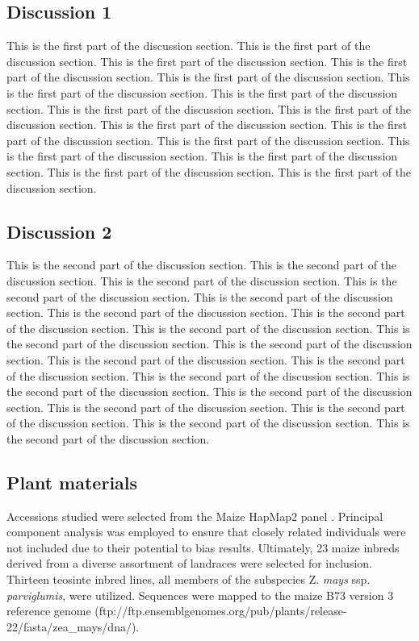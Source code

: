 \documentclass{pnastwo}
\begin{document}
\begin{article}
\subsection{Discussion 1}
This is the first part of the discussion section. This is the first
part of the discussion section. This is the first part of the
discussion section. This is the first part of the discussion
section. This is the first part of the discussion section. This is the
first part of the discussion section. This is the first part of the
discussion section. This is the first part of the discussion
section. This is the first part of the discussion section. This is the
first part of the discussion section. This is the first part of the
discussion section. This is the first part of the discussion
section. This is the first part of the discussion section. This is the
first part of the discussion section. This is the first part of the
discussion section. This is the first part of the discussion section. 

\subsection{Discussion 2}
This is the second part of the discussion section. This is the second
part of the discussion section. This is the second part of the
discussion section. This is the second part of the discussion
section. This is the second part of the discussion section. This is
the second part of the discussion section. This is the second part of
the discussion section. This is the second part of the discussion
section. This is the second part of the discussion section. This is
the second part of the discussion section. This is the second part of
the discussion section. This is the second part of the discussion
section. This is the second part of the discussion section. This is
the second part of the discussion section. This is the second part of
the discussion section. This is the second part of the discussion
section. This is the second part of the discussion section. This is
the second part of the discussion section. This is the second part of
the discussion section. 

\begin{materials}
\subsection{Plant materials}
Accessions studied were selected from the Maize HapMap2
panel \cite{hapmap2} . Principal component analysis was employed to ensure that
closely related individuals were not included due to their potential
to bias results. Ultimately, 23 maize inbreds derived from a diverse
assortment of landraces were selected for inclusion. Thirteen teosinte
inbred lines, all members of the subspecies Z. \emph{mays}
ssp. \emph{parviglumis}, were utilized. Sequences were mapped to the
maize B73 version 3 reference genome \cite{maizeGenome}
(ftp://ftp.ensemblgenomes.org/pub/plants/release-22/fasta/zea\_mays/dna/).



\end{materials}
\end{article}
\end{document}
